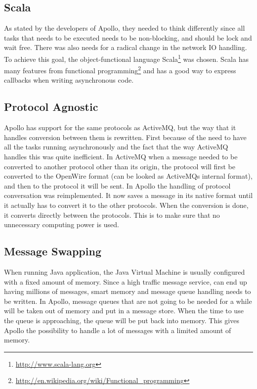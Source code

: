 \subsection{Scala}
As stated by the developers of Apollo, they needed to think differently since all tasks that needs to be executed needs to be non-blocking, and should be lock and wait free. There was also needs for a radical change in the network IO handling. To achieve this goal, the object-functional language Scala\footnote{\url{http://www.scala-lang.org}} was chosen. Scala has many features from functional programming\footnote{\url{http://en.wikipedia.org/wiki/Functional_programming}} and has a good way to express callbacks when writing asynchronous code.

\subsection{Protocol Agnostic}
Apollo has support for the same protocols as ActiveMQ, but the way that it handles conversion between them is rewritten. First because of the need to have all the tasks running asynchronously and the fact that the way ActiveMQ handles this was quite inefficient. 
In ActiveMQ when a message needed to be converted to another protocol other than its origin, the protocol will first be converted to the OpenWire format (can be looked as ActiveMQs internal format), and then to the protocol it will be sent. 
In Apollo the handling of protocol conversation was reimplemented. It now saves a message in its native format until it actually has to convert it to the other protocols. When the conversion is done, it converts directly between the protocols. This is to make sure that no unnecessary computing power is used.

\subsection{Message Swapping}
When running Java application, the Java Virtual Machine is usually configured with a fixed amount of memory. Since a high traffic message service, can end up having millions of messages, smart memory and message queue handling needs to be written. 
In Apollo, message queues that are not going to be needed for a while will be taken out of memory and put in a message store. When the time to use the queue is approaching, the queue will be put back into memory. This gives Apollo the possibility to handle a lot of messages with a limited amount of memory.

